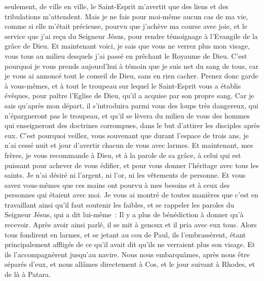 \begin{multicols}{2}
seulement, de ville en ville, le Saint-Esprit m'avertit que des liens et des tribulations m'attendent.
Mais je ne fais pour moi-même aucun cas de ma vie, comme si elle m'était précieuse, pourvu que j'achève ma course avec joie, et le service que j'ai reçu du Seigneur Jésus, pour rendre témoignage à l'Evangile de la grâce de Dieu.
Et maintenant voici, je sais que vous ne verrez plus mon visage, vous tous au milieu desquels j'ai passé en prêchant le Royaume de Dieu.
C'est pourquoi je vous prends aujourd'hui à témoin que je suis net du sang de tous,
car je vous ai annoncé tout le conseil de Dieu, sans en rien cacher.
Prenez donc garde à vous-mêmes, et à tout le troupeau sur lequel le Saint-Esprit vous a établis évêques, pour paître l'Eglise de Dieu, qu'il a acquise par son propre sang.
Car je sais qu'après mon départ, il s'introduira parmi vous des loups très dangereux, qui n'épargneront pas le troupeau,
et qu'il se lèvera du milieu de vous des hommes qui enseigneront des doctrines corrompues, dans le but d'attirer les disciples après eux.
C'est pourquoi veillez, vous souvenant que durant l'espace de trois ans, je n'ai cessé nuit et jour d'avertir chacun de vous avec larmes.
Et maintenant, mes frères, je vous recommande à Dieu, et à la parole de sa grâce, à celui qui est puissant pour achever de vous édifier, et pour vous donner l'héritage avec tous les saints.
Je n'ai désiré ni l'argent, ni l'or, ni les vêtements de personne.
Et vous savez vous-mêmes que ces mains ont pourvu à mes besoins et à ceux des personnes qui étaient avec moi.
Je vous ai montré de toutes manières que c'est en travaillant ainsi qu'il faut soutenir les faibles, et se rappeler les paroles du Seigneur Jésus, qui a dit lui-même~: Il y a plus de bénédiction à donner qu'à recevoir.
Après avoir ainsi parlé, il se mit à genoux et il pria avec eux tous.
Alors tous fondirent en larmes, et se jetant au cou de Paul,
ils l'embrassèrent, étant principalement affligés de ce qu'il avait dit qu'ils ne verraient plus son visage. Et ils l'accompagnèrent jusqu'au navire.
\VerseOne{}Nous nous embarquâmes, après nous être séparés d'eux, et nous allâmes directement à Cos, et le jour suivant à Rhodes, et de là à Patara.

\end{multicols}
